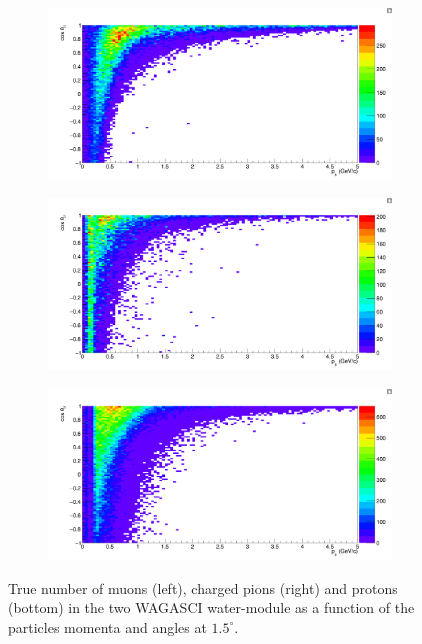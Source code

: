 \begin{figure}
  \centering
  \begin{subfigure}{.49\textwidth}
    \includegraphics[width=\linewidth]{fig/TrueInteractions_Muon.png}
  \end{subfigure}
  \begin{subfigure}{.49\textwidth}
    \includegraphics[width=\linewidth]{fig/TrueInteractions_Pion.png}
  \end{subfigure}
  \begin{subfigure}{.49\textwidth}
    \includegraphics[width=\linewidth]{fig/TrueInteractions_Proton.png}
  \end{subfigure}
  \caption{\label{fig:trueinteraction_particle} True number of muons (left), charged pions (right) and protons (bottom) in the two WAGASCI water-module as a function of the particles momenta and angles at $1.5^{\circ}$.}
\end{figure}

